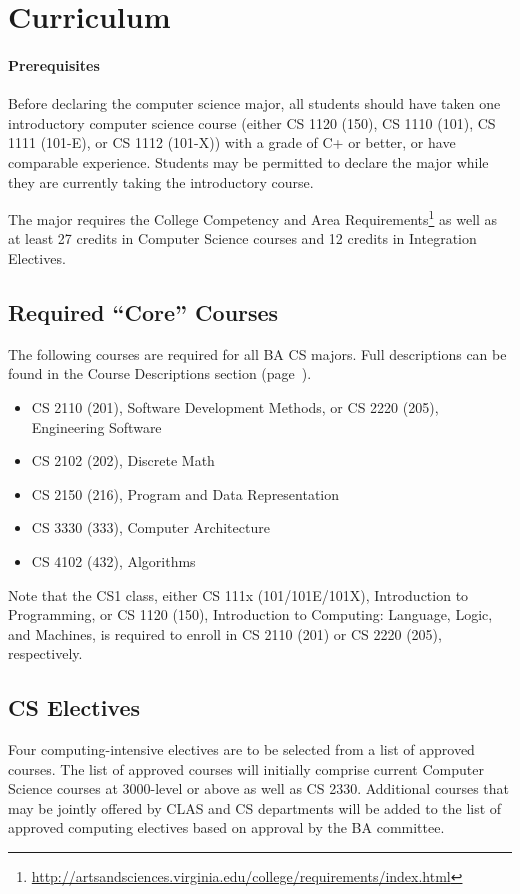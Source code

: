 \documentclass[10pt,letter]{book}
\newenvironment{itemlist}{
\begin{itemize}
\setlength{\itemsep}{0pt}
\setlength{\parskip}{0pt}}
{\end{itemize}}
\newcommand{\mysection}[1]{\section{#1}\renewcommand{\rightmark}{#1}}
\newcommand{\myurl}[1]{\footnote{\scriptsize\url{#1}}}
\begin{document}
\mysection{Curriculum}

\paragraph{Prerequisites}

Before declaring the computer science major, all students should have
taken one introductory computer science course (either CS 1120 (150),
CS 1110 (101), CS 1111 (101-E), or CS 1112 (101-X)) with a grade of C+
or better, or have comparable experience. Students may be permitted to
declare the major while they are currently taking the introductory
course.

The major requires the College Competency and Area
Requirements\myurl{http://artsandsciences.virginia.edu/college/requirements/index.html}
as well as at least 27 credits in Computer Science courses and 12
credits in Integration Electives.

\subsection{Required ``Core'' Courses}

The following courses are required for all BA CS majors.  Full
descriptions can be found in the Course Descriptions section
(page~\pageref{sec:coursedesc}).

\begin{itemlist}
\item CS 2110 (201), Software Development Methods, or CS 2220 (205),
  Engineering Software
\item CS 2102 (202), Discrete Math
\item CS 2150 (216), Program and Data Representation
\item CS 3330 (333), Computer Architecture
\item CS 4102 (432), Algorithms
\end{itemlist}

Note that the CS1 class, either CS 111x (101/101E/101X), Introduction
to Programming, or CS 1120 (150), Introduction to Computing: Language,
Logic, and Machines, is required to enroll in CS 2110 (201) or CS
2220 (205), respectively.

\subsection{CS Electives}

Four computing-intensive electives are to be selected from a list of
approved courses. The list of approved courses will initially comprise
current Computer Science courses at 3000-level or above as well as CS
2330. Additional courses that may be jointly offered by CLAS and CS
departments will be added to the list of approved computing electives
based on approval by the BA committee.
\end{document}
